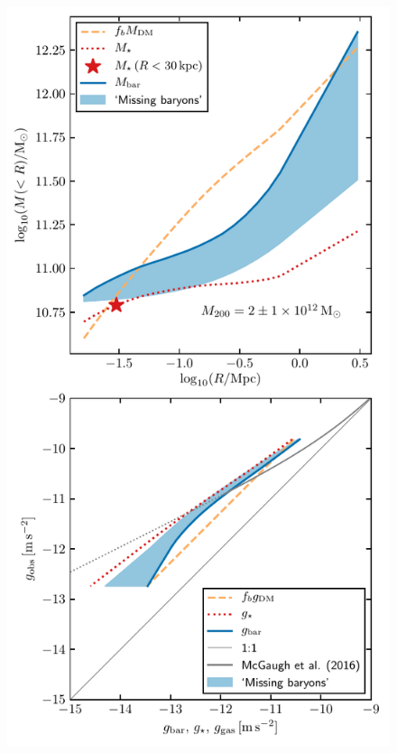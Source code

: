 \documentclass[usenatbib]{mnras}
\begin{document}
\begin{figure}
	\includegraphics[width=\columnwidth]{Figures/missing_baryons.pdf}

\end{figure}
\end{document}
